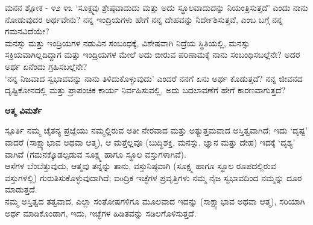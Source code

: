 \newpage
\begin{mananam}{\mananamfont ಮನನ ಶ್ಲೋಕ - ೪೨ ೪೩}
\mananamtext ‘ಸೂಕ್ಷ್ಮವು ಶ್ರೇಷ್ಠವಾದುದು ಮತ್ತು ಅದು ಸ್ಥೂಲವಾದುದನ್ನು ನಿಯಂತ್ರಿಸುತ್ತದೆ’ ಎಂದು ನಾನು ನೋಡುವುದರ  ಅರ್ಥವೇನು?
ನನ್ನ ಇಂದ್ರಿಯಗಳು ಹೇಗೆ ನನ್ನ ದೇಹವನ್ನು ನಿರ್ದೇಶಿಸುತ್ತವೆ, ಎಂಬ ಬಗ್ಗೆ ನನ್ನ ಗಮನವಿದೆಯೇ?\\
ಮನಸ್ಸು ಮತ್ತು ಇಂದ್ರಿಯಗಳ ನಡುವಿನ ಸಂಬಂಧಕ್ಕೆ, ವಿಶೇಷವಾಗಿ ನಿದ್ರೆಯ ಸ್ಥಿತಿಯಲ್ಲಿ, ಮನಸ್ಸು ಸಕ್ರಿಯವಾಗಿಲ್ಲದಿದ್ದಾಗ ಮತ್ತು ಇಂದ್ರಿಯಗಳ ಮೇಲೆ ಅದು ಬೀರುವ ಪರಿಣಾಮಕ್ಕೆ  ನಾನು ಸಂಬಂಧಿಸಬಲ್ಲೆನೇ? ಅದರ ಅರ್ಥ ಏನೆಂದು ಗ್ರಹಿಸಬಲ್ಲೆನೇ?\\
‘ನನ್ನ ನಿಜವಾದ ಸ್ವಭಾವವನ್ನು ನಾನು ತಿಳಿದುಕೊಳ್ಳುವುದು’ ಎಂದರೆ ನನಗೆ ಏನು ಅರ್ಥ ಕೊಡುತ್ತದೆ? ನನ್ನ ಜೀವನದ ದೃಷ್ಟಿಕೋನದಲ್ಲಿ ಮತ್ತು ಪ್ರಾಪಂಚಿಕ ಕಾರ್ಯ ನಿರ್ವಹಿಸುವಲ್ಲಿ, ಅದು ಬದಲಾವಣೆಗೆ ಹೇಗೆ ಕಾರಣವಾಗುತ್ತದೆ?
\end{mananam}
\WritingHand\enspace\textbf{ಆತ್ಮ ವಿಮರ್ಶೆ}\\
\begin{inspiration}{\mananamfont ಸ್ಪೂರ್ತಿ}
\tiny \mananamtext ನಮ್ಮ ಚೈತನ್ಯ ಪ್ರಜ್ಞೆಯು ನಮ್ಮಲ್ಲಿರುವ ಅತೀ ನೇರವಾದ ಮತ್ತು ಅತ್ಯುತ್ತಮವಾದ ಅಸ್ತಿತ್ವವಾಗಿದೆ; ಇದು ‘ದೃಷ್ಟ’ ವಾದರೆ (ಸಾಕ್ಷ್ಯಾಭಾವ ಅಥವಾ ಆತ್ಮ), ಆ ಮತ್ತೆಲ್ಲವೂ (ಬುದ್ಧಿಶಕ್ತಿ, ಮನಸ್ಸು, ಜ್ಞಾನ ಮತ್ತು ದೇಹ) ಇದಕ್ಕೆ ‘ದೃಶ್ಯ’ ವಾಗಿವೆ (ಗಮನಕ್ಕೊಡಲ್ಪಡುವ ಸೂಕ್ಷ್ಮ ಹಾಗೂ ಸ್ಥೂಲ  ವಸ್ತುಗಳಾಗಿವೆ).\\
ಆಸೆಗಳ ಬೆಂಬೆತ್ತುವುದು, ಆತ್ಮವು ತನ್ನನ್ನು ತಾನು, ವಸ್ತುನಿಷ್ಠವಾಗಿ (ಸೂಕ್ಷ್ಮ ಹಾಗೂ ಸ್ಥೂಲ ರೂಪದಲ್ಲಿರುವ  ವಸ್ತುಗಳಲ್ಲಿ) ಗುರುತಿಸುಕೊಳ್ಳುವುದಾಗಿದೆ; ಐoದ್ರಿಕ ಇಚ್ಛೆಗಳ ಪ್ರವೃತ್ತಿಗಳು ನಮ್ಮ ನೈಜ ಸ್ವಭಾವದಿಂದ ನಮ್ಮನ್ನು ದೂರ ಮಾಡುತ್ತದೆ.\\
ನಮ್ಮ ಅಸ್ತಿತ್ವದ ತತ್ವವಾದ, ಎಲ್ಲಾ ಸಂತೋಷಗಳಿಗೂ ಮೂಲವಾದ ಇದನ್ನು (ಸಾಕ್ಷ್ಯಾಭಾವ ಅಥವಾ ಆತ್ಮ), ಸರಿಯಾಗಿ ಅರ್ಥ ಮಾಡಿಕೊಂಡಾಗ, ಇದು, ಇಚ್ಛೆಗಳ ಹಿಡಿತವನ್ನು ಸಡಿಲಗೊಳಿಸುತ್ತದೆ.
\end{inspiration}
\newpage


